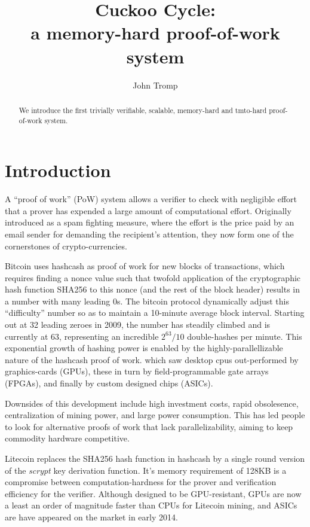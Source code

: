 \documentclass[11pt, oneside]{article}
\title{Cuckoo Cycle: \protect\\ a memory-hard proof-of-work system}
\author{John Tromp}
\begin{document}
\maketitle

\begin{abstract}
We introduce the first trivially verifiable, scalable, memory-hard and tmto-hard proof-of-work system.
\end{abstract}

\section{Introduction}
A ``proof of work'' (PoW) system allows a verifier to check with
negligible effort that a prover has expended a large amount of computational effort.
Originally introduced as a spam fighting measure, 
where the effort is the price paid by an email sender for demanding the recipient's attention,
they now form one of the cornerstones of crypto-currencies.

Bitcoin\cite{nakamoto2009bitcoin} uses hashcash\cite{back2002} as proof of work for
new blocks of transactions, which requires finding a nonce value such that
twofold application of the cryptographic hash function SHA256
to this nonce (and the rest of the block header) results in a number with many
leading 0s.  The bitcoin protocol dynamically adjust this ``difficulty'' number
so as to maintain a 10-minute average block interval. Starting out at 32 leading zeroes in 2009,
the number has steadily climbed and is currently at 63, representing
an incredible $2^{63}/10$ double-hashes per minute. This exponential growth of hashing power
is enabled by the highly-parallellizable nature of the hashcash proof of work.
which saw desktop cpus out-performed by graphics-cards (GPUs),
these in turn by field-programmable gate arrays (FPGAs),
and finally by custom designed chips (ASICs).

Downsides of this development include high investment costs, rapid obsolesence,
centralization of mining power, and large power consumption.
This has led people to look for alternative proofs of work that lack parallelizability,
aiming to keep commodity hardware competitive.

Litecoin replaces the SHA256 hash function in hashcash by a single round version of the
{\em scrypt} key derivation function. It's memory requirement of 128KB is a compromise
between computation-hardness for the prover and verification efficiency for the verifier.
Although designed to be GPU-resistant, GPUs are now a least an order of magnitude faster
than CPUs for Litecoin mining, and ASICs are have appeared on the market in early 2014.
\end{document}
